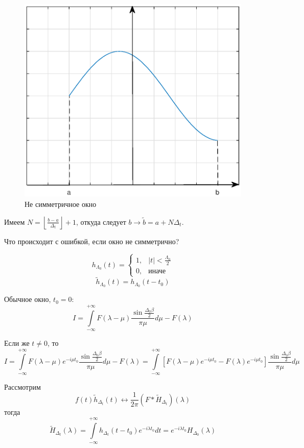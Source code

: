 \begin{figure}[H]
\begin{center}
\includegraphics[width=0.6\linewidth]{ch8/ch8_fig5.eps}
\caption{Не симметричное окно}
\label{ch1.fig5}
\end{center}
\end{figure}
Имеем $N = \left\lfloor \frac{b - a}{\Delta_t} \right\rfloor + 1$, откуда следует $b \to \widetilde{b} = a + N \Delta_t$.

Что происходит с ошибкой, если окно не симметрично?

\begin{equation*}
h_{\Lambda_0} (t) = \begin{cases} 1, & |t| < \frac{\Lambda_0}{2} \\ 0, &\text{иначе} \end{cases}
\end{equation*}
\begin{equation*}
\widetilde{h}_{\Lambda_0} (t) = h_{\Lambda_0} (t - t_0)
\end{equation*}

Обычное окно, $t_0 = 0$:
\begin{equation*}
I = \int\limits_{-\infty}^{+\infty} F(\lambda - \mu) \frac{ \sin \frac{\Delta_0 \beta}{2}}{\pi \mu} d \mu - F(\lambda)
\end{equation*} 

Если же $t \neq 0$, то 
\begin{equation*}
I = \int\limits_{-\infty}^{+\infty} F(\lambda - \mu) e^{-i \mu t_0} \frac{ \sin \frac{\Delta_0 \beta}{2}}{\pi \mu} d \mu - F(\lambda) = \int\limits_{-\infty}^{+\infty} \left[ F(\lambda - \mu) e^{-i \mu t_0} - F(\lambda) e^{-i \mu t_0} \right] \frac{ \sin \frac{\Delta_0 \beta}{2}}{\pi \mu} d \mu
\end{equation*}

Рассмотрим 
\begin{equation*}
f(t) \widetilde{h}_{\Delta_t} (t) \longleftrightarrow \frac{1}{2 \pi} (F \ast \widetilde{H}_{\Delta_t}) (\lambda)
\end{equation*}
 тогда 
\begin{equation*}
\widetilde{H}_{\Delta_t}(\lambda) = \int\limits_{-\infty}^{+\infty} h_{\Delta_t} (t - t_0) e^{-i \lambda t_0} dt = e^{-i \lambda t_0} H_{\Delta_0} (\lambda)
\end{equation*}

